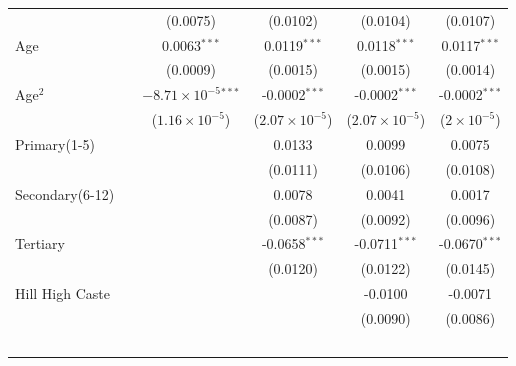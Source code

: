 \begin{tabular}{lccccc}
                                                           &                & (0.0075)                       & (0.0102)                & (0.0104)                & (0.0107)\\   
   Age                                                     &                & 0.0063$^{***}$                 & 0.0119$^{***}$          & 0.0118$^{***}$          & 0.0117$^{***}$\\   
                                                           &                & (0.0009)                       & (0.0015)                & (0.0015)                & (0.0014)\\   
   Age$^2$                                            &                & $-8.71\times 10^{-5}$$^{***}$  & -0.0002$^{***}$         & -0.0002$^{***}$         & -0.0002$^{***}$\\   
                                                           &                & ($1.16\times 10^{-5}$)         & ($2.07\times 10^{-5}$)  & ($2.07\times 10^{-5}$)  & ($2\times 10^{-5}$)\\    
   Primary(1-5)                 &                &                                & 0.0133                  & 0.0099                  & 0.0075\\   
                                                           &                &                                & (0.0111)                & (0.0106)                & (0.0108)\\   
   Secondary(6-12)              &                &                                & 0.0078                  & 0.0041                  & 0.0017\\   
                                                           &                &                                & (0.0087)                & (0.0092)                & (0.0096)\\   
   Tertiary                     &                &                                & -0.0658$^{***}$         & -0.0711$^{***}$         & -0.0670$^{***}$\\   
                                                           &                &                                & (0.0120)                & (0.0122)                & (0.0145)\\   
   Hill High Caste                          &                &                                &                         & -0.0100                 & -0.0071\\   
                                                           &                &                                &                         & (0.0090)                & (0.0086)\\   
$$
\end{tabular}
